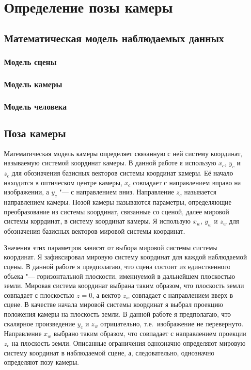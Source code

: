 

\chapter{Определение позы камеры}
\section{Математическая модель наблюдаемых данных}
\subsection{Модель сцены}
\subsection{Модель камеры}
\subsection{Модель человека}
\section{Поза камеры}

Математическая модель камеры определяет связанную с ней систему координат, называемую системой координат камеры. В данной работе я использую $x_c$, $y_c$ и $z_c$ для обозначения базисных векторов системы координат камеры. Её начало находится в оптическом центре камеры, $x_c$ совпадает с направлением вправо на изображении, а $y_c$ "--- с направлением вниз. Направление $z_c$ называется направлением камеры. Позой камеры называются параметры, определяющие преобразование из системы координат, связанные со сценой, далее мировой системы коррдинат, в систему координат камеры. Я использую $x_w$, $y_w$ и $z_w$ для обозначения базисных векторов мировой системы координат.

Значения этих параметров зависят от выбора мировой системы системы координат. Я зафиксировал мировую систему координат для каждой наблюдаемой сцены. В данной работе я предполагаю, что сцена состоит из единственного объека "--- горизонтальной плоскости, именнуемой в дальнейшем плоскостью земли. Мировая система координат выбрана таким образом, что плоскость земли совпадает с плоскостью $z=0$, а вектор $z_w$ совпадает с направлением вверх в сцене. В качестве начала мировой системы координат я выбрал проекцию положения камеры на плоскость земли. В данной работе я предполагаю, что скалярное произведение $y_c$ и $z_w$ отрицательно, т.е.~изображение не перевернуто. Направление $x_w$ выбрано таким образом, что совпадает с направлением проекции $z_c$ на плоскость земли.  Описанные ограничения однозначно определяют мировую систему координат в наблюдаемой сцене, а, следовательно, однозначно определяют позу камеры.

